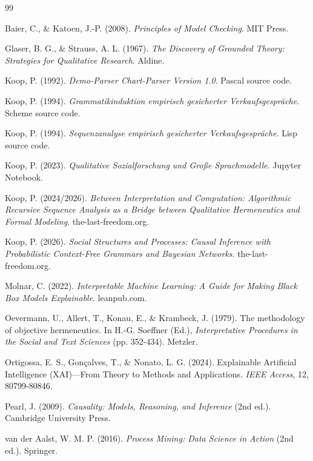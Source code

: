 \documentclass[12pt,a4paper]{article}
\begin{document}
\newpage
\begin{thebibliography}{99}

Baier, C., \& Katoen, J.-P. (2008). \textit{Principles of Model Checking}. 
MIT Press.

Glaser, B. G., \& Strauss, A. L. (1967). \textit{The Discovery of Grounded 
Theory: Strategies for Qualitative Research}. Aldine.

Koop, P. (1992). \textit{Demo-Parser Chart-Parser Version 1.0}. Pascal source code.

Koop, P. (1994). \textit{Grammatikinduktion empirisch gesicherter 
Verkaufsgespräche}. Scheme source code.

Koop, P. (1994). \textit{Sequenzanalyse empirisch gesicherter 
Verkaufsgespräche}. Lisp source code.

Koop, P. (2023). \textit{Qualitative Sozialforschung und Große Sprachmodelle}. 
Jupyter Notebook.

Koop, P. (2024/2026). \textit{Between Interpretation and Computation: 
Algorithmic Recursive Sequence Analysis as a Bridge between Qualitative 
Hermeneutics and Formal Modeling}. the-last-freedom.org.

Koop, P. (2026). \textit{Social Structures and Processes: Causal Inference 
with Probabilistic Context-Free Grammars and Bayesian Networks}. 
the-last-freedom.org.

Molnar, C. (2022). \textit{Interpretable Machine Learning: A Guide for 
Making Black Box Models Explainable}. leanpub.com.

Oevermann, U., Allert, T., Konau, E., \& Krambeck, J. (1979). The methodology 
of objective hermeneutics. In H.-G. Soeffner (Ed.), \textit{Interpretative 
Procedures in the Social and Text Sciences} (pp. 352-434). Metzler.

Ortigossa, E. S., Gonçalves, T., \& Nonato, L. G. (2024). Explainable 
Artificial Intelligence (XAI)—From Theory to Methods and Applications. 
\textit{IEEE Access}, 12, 80799-80846.

Pearl, J. (2009). \textit{Causality: Models, Reasoning, and Inference} 
(2nd ed.). Cambridge University Press.

van der Aalst, W. M. P. (2016). \textit{Process Mining: Data Science in 
Action} (2nd ed.). Springer.

\end{thebibliography}
\end{document}
